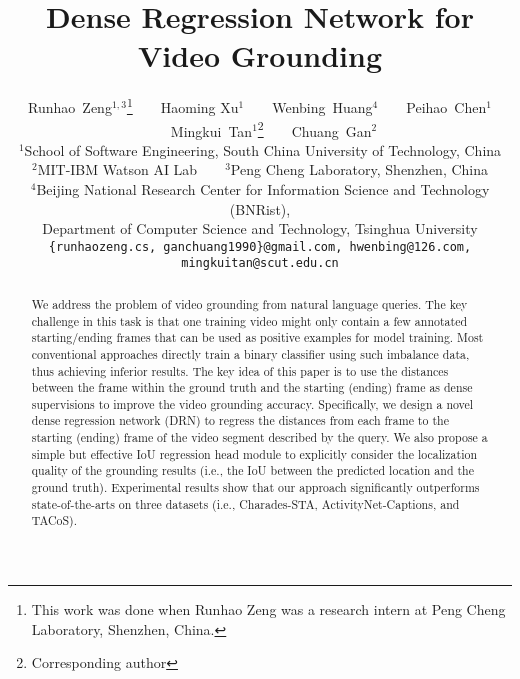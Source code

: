 \documentclass[10pt,twocolumn,letterpaper]{article}
\begin{document}
	
\title{Dense Regression Network for Video Grounding}
	
	\author{
		Runhao~Zeng$^{1,3}$\thanks{This work was done when Runhao Zeng was a research intern at Peng Cheng Laboratory, Shenzhen, China.}~~~~Haoming Xu$^{1}$~~~~Wenbing~Huang$^{4}$~~~~Peihao~Chen$^{1}$~~~~Mingkui~Tan$^{1}$\thanks{Corresponding author}~~~~Chuang~Gan$^{2}$\\
		$^{1}$School of Software Engineering, South China University of Technology, China \\ 
		$^{2}$MIT-IBM Watson AI Lab~~~~$^{3}$Peng Cheng Laboratory, Shenzhen, China \\
		$^{4}$Beijing National Research Center for Information Science and Technology (BNRist), \\
        Department of Computer Science and Technology, Tsinghua University\\
		{\tt\small \{runhaozeng.cs, ganchuang1990\}@gmail.com, hwenbing@126.com,
			mingkuitan@scut.edu.cn}
	}



	
\maketitle
	\pagestyle{empty}
	\thispagestyle{empty}
	




	
	











		






		




	
	





\begin{abstract}
We address the problem of video grounding from natural language queries. The key challenge in this task is that one training video might only contain a few annotated starting/ending frames that can be used as positive examples for model training. Most conventional approaches directly train a binary classifier using such imbalance data, thus achieving inferior results. The key idea of this paper is to use the distances between the frame within the ground truth and the starting (ending) frame as dense supervisions to improve the video grounding accuracy.  Specifically, we design a novel dense regression network (DRN) to regress the distances from each frame to the starting (ending) frame of the video segment described by the query.  We also propose a simple but effective IoU regression head module to explicitly consider the localization quality of the grounding results (i.e., the IoU between the predicted location and the ground truth). Experimental results show that our approach significantly outperforms state-of-the-arts on three datasets (i.e., Charades-STA, ActivityNet-Captions, and TACoS). 
\end{abstract}
\end{document}
